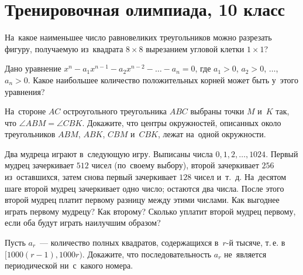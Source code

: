 

\section*{Тренировочная олимпиада, 10 класс}



\begin{problems}

\item
На~какое наименьшее число равновеликих треугольников можно разрезать фигуру,
получаемую из~квадрата $8 \times 8$ вырезанием угловой клетки $1 \times 1$?

\item
Дано уравнение
$x^n - a_1 x^{n-1} - a_2 x^{n-2} - \ldots - a_n = 0$,
где $a_1 > 0$, $a_2 > 0$, $\ldots$, $a_n > 0$.
Какое наибольшее количество положительных корней может быть у~этого уравнения?

\item
На~стороне $AC$ остроугольного треугольника $ABC$ выбраны точки $M$ и~$K$ так,
что $\angle ABM = \angle CBK$.
Докажите, что центры окружностей, описанных около треугольников
$ABM$, $ABK$, $CBM$ и~$CBK$, лежат на~одной окружности.

\item
Два мудреца играют в~следующую игру.
Выписаны числа $0, 1, 2, \ldots, 1024$.
Первый мудрец зачеркивает $512$ чисел (по~своему выбору), второй зачеркивает
$256$ из~оставшихся, затем снова первый зачеркивает $128$ чисел и~т.~д.
На~десятом шаге второй мудрец зачеркивает одно число; остаются два числа.
После этого второй мудрец платит первому разницу между этими числами.
Как выгоднее играть первому мудрецу?
Как второму?
Сколько уплатит второй мудрец первому, если оба будут играть наилучшим образом?

\item
Пусть $a_r$~--- количество полных квадратов, содержащихся в~$r$-й тысяче,
т.\,е. в~%
$[1000 (r - 1), 1000r)$.
Докажите, что последовательность $a_r$ не~является периодической ни~с~какого
номера.

\end{problems}

